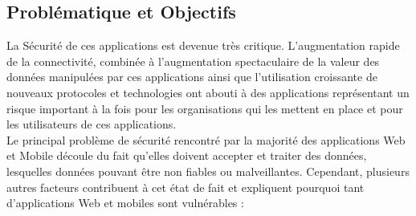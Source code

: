 \subsection{Problématique et Objectifs}
La Sécurité de ces applications est devenue très critique. L’augmentation rapide de la connectivité, combinée à l’augmentation spectaculaire de la valeur des données manipulées par ces applications ainsi que l’utilisation croissante de nouveaux protocoles et technologies ont abouti à des applications représentant un risque important à la fois pour les organisations qui les mettent en place et pour les utilisateurs de ces applications.\\
Le principal problème de sécurité rencontré par la majorité des applications Web et Mobile découle du fait qu’elles doivent accepter et traiter des données, lesquelles données pouvant être non fiables ou malveillantes. Cependant, plusieurs autres facteurs \cite{hacker-handbook} contribuent à cet état de fait et expliquent pourquoi tant d'applications Web et mobiles sont vulnérables :

